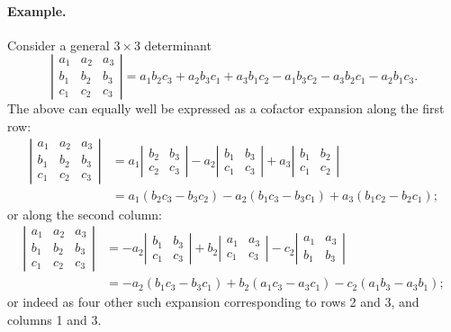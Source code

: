 \documentclass[12pt]{article}
\begin{document}
\paragraph{Example.}
Consider a general $3\times 3$ determinant
$$
\left|
\begin{matrix}
a_1 & a_2 & a_3 \\
b_1 & b_2 & b_3 \\
c_1 & c_2 & c_3
\end{matrix}
\right|= a_1 b_2 c_3 + a_2 b_3 c_1 + a_3 b_1 c_2 - a_1 b_3 c_2 - a_3
b_2 c_1 - a_2 b_1 c_3.
$$
The above can equally well be expressed as a cofactor expansion along
the first row:
\begin{align*}
\left|\begin{matrix}
a_1 & a_2 & a_3 \\
b_1 & b_2 & b_3 \\
c_1 & c_2 & c_3
\end{matrix}
\right| &=
a_1 \left| \begin{matrix} b_2 & b_3 \\ c_2 & c_3 \end{matrix}\right|
-
a_2 \left| \begin{matrix} b_1 & b_3 \\ c_1 & c_3 \end{matrix}\right|
+
a_3 \left| \begin{matrix} b_1 & b_2 \\ c_1 & c_2
\end{matrix}\right|\\
&= a_1(b_2 c_3-b_3 c_2) - a_2(b_1 c_3 - b_3 c_1) + a_3(b_1 c_2-b_2c_1);
\end{align*}
or along the second column:
\begin{align*}
\left|\begin{matrix}
a_1 & a_2 & a_3 \\
b_1 & b_2 & b_3 \\
c_1 & c_2 & c_3
\end{matrix}
\right| &=
-a_2 \left| \begin{matrix} b_1 & b_3 \\ c_1 & c_3 \end{matrix}\right|
+
b_2 \left| \begin{matrix} a_1 & a_3 \\ c_1 & c_3 \end{matrix}\right|
-
c_2 \left| \begin{matrix} a_1 & a_3 \\ b_1 & b_3
\end{matrix}\right|\\
&= -a_2(b_1 c_3-b_3 c_1) + b_2(a_1 c_3 - a_3 c_1) - c_2(a_1 b_3-a_3 b_1);
\end{align*}
or indeed as four other such expansion corresponding to rows 2 and 3,
and columns 1 and 3.
\end{document}
